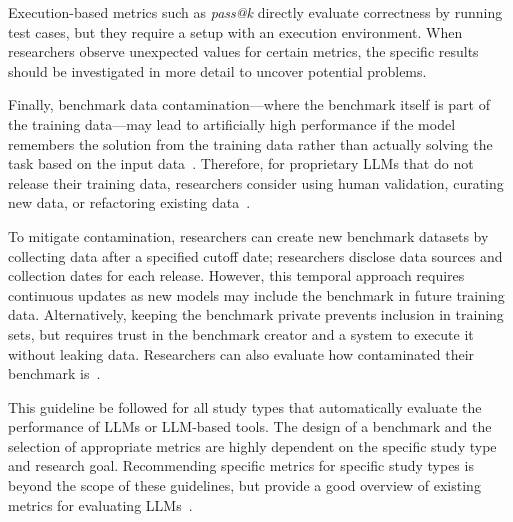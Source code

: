 Execution-based metrics such as \emph{pass@k} directly evaluate correctness by running test cases, but they require a setup with an execution environment.
When researchers observe unexpected values for certain metrics, the specific results should be investigated in more detail to uncover potential problems.

Finally, benchmark data contamination---where the benchmark itself is part of the training data---may lead to artificially high performance if the model remembers the solution from the training data rather than actually solving the task based on the input data~\cite{DBLP:journals/corr/abs-2406-04244}. Therefore, for proprietary LLMs that do not release their training data, researchers \should consider using human validation, curating new data, or refactoring existing data~\cite{DBLP:journals/corr/abs-2406-04244}. 

To mitigate contamination, researchers can create new benchmark datasets by collecting data after a specified cutoff date; researchers \must disclose data sources and collection dates for each release. However, this temporal approach requires continuous updates as new models may include the benchmark in future training data. Alternatively, keeping the benchmark private prevents inclusion in training sets, but requires trust in the benchmark creator and a system to execute it without leaking data. Researchers can also evaluate how contaminated their benchmark is~\cite{choi2025contaminatedbenchmarkquantifyingdataset}.



This guideline \must be followed for all study types that automatically evaluate the performance of LLMs or LLM-based tools.
The design of a benchmark and the selection of appropriate metrics are highly dependent on the specific study type and research goal.
Recommending specific metrics for specific study types is beyond the scope of these guidelines, but \citeauthor{hu2025assessingadvancingbenchmarksevaluating} provide a good overview of existing metrics for evaluating LLMs~\cite{hu2025assessingadvancingbenchmarksevaluating}.

